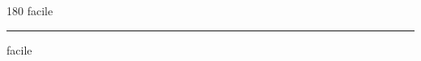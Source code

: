 
\begin{frame}
\begin{center}
\begin{turn}{180}
{\fontsize{2.5cm}{1em}\selectfont facile}
\end{turn}
\vspace{1em}\par  
\hrule
\vspace{1em}\par  
{\fontsize{2.5cm}{1em}\selectfont facile}
\end{center}
\end{frame}
